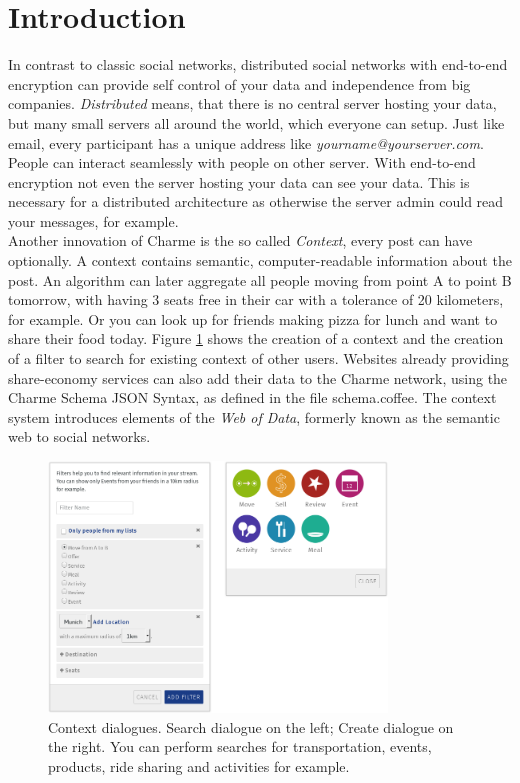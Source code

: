 \documentclass{scrartcl}
\begin{document}
\newpage
\section{Introduction}
In contrast to classic social networks, distributed social networks with end-to-end encryption can provide self control of your data and  independence from big companies.  \textit{Distributed} means, that there is no central server hosting your data, but many small servers all around the world, which everyone can  setup. Just like email, every participant has a unique address like \textit{yourname@yourserver.com}. People can interact seamlessly with people on other server. With end-to-end encryption not even the server hosting your data can see your data. This is necessary for a distributed architecture as otherwise the server admin could read your messages, for example.\\

Another innovation of Charme is the so called \textit{Context}, every post can have optionally. A context contains semantic, computer-readable information about the post.
 An algorithm can later aggregate all people moving from point A to point B tomorrow, with having 3 seats free in their car with a tolerance of 20 kilometers, for example. Or you can look up for friends making pizza for lunch and want to share their food today. Figure \ref{figContext} shows the creation of a context and the creation of a filter to search for existing context of other users. 
 Websites already providing share-economy services can also add their data to the Charme network, using the Charme Schema JSON Syntax, as defined in the file schema.coffee. The context system introduces elements of the \textit{Web of Data}, formerly known as the semantic web to social networks.

\begin{figure}[ht]
	\centering
  \includegraphics[width=90mm]{illustrations/context.jpg}
	\caption{Context dialogues. Search dialogue on the left; Create dialogue on the right. You can perform searches for transportation, events, products, ride sharing and activities for example.}
	\label{figContext}
\end{figure}
\newpage
\end{document}
